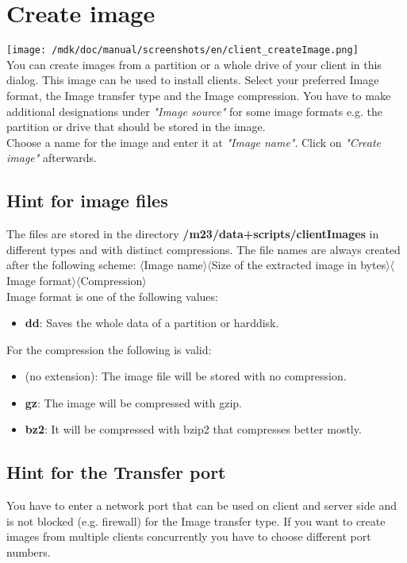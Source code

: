 \section{Create image}
\texttt{[image: /mdk/doc/manual/screenshots/en/client\_createImage.png]} \\
You can create images from a partition or a whole drive of your client in this dialog. This image can be used to install clients. Select your preferred Image format, the Image transfer type and the Image compression. You have to make additional designations under \textit{"Image source"} for some image formats e.g. the partition or drive that should be stored in the image.\\
Choose a name for the image and enter it at \textit{"Image name"}. Click on \textit{"Create image"} afterwards.\\
\subsection{Hint for image files}
The files are stored in the directory \textbf{/m23/data+scripts/clientImages} in different types and with distinct compressions. The file names are always created after the following scheme: $\langle$Image name$\rangle$$\langle$Size of the extracted image in bytes$\rangle$$\langle$Image format$\rangle$$\langle$Compression$\rangle$\\
Image format is one of the following values:\\
\begin{itemize}
\item \textbf{dd}: Saves the whole data of a partition or harddisk.\\
\end{itemize}
For the compression the following is valid:\\
\begin{itemize}
\item (no extension): The image file will be stored with no compression.\\
\item \textbf{gz}: The image will be compressed with  gzip.\\
\item \textbf{bz2}: It will be compressed with bzip2 that compresses better mostly.\\
\end{itemize}
\subsection{Hint for the Transfer port}
You have to enter a network port that can be used on client and server side and is not blocked (e.g. firewall) for the Image transfer type. If you want to create images from multiple clients concurrently you have to choose different port numbers.\\
